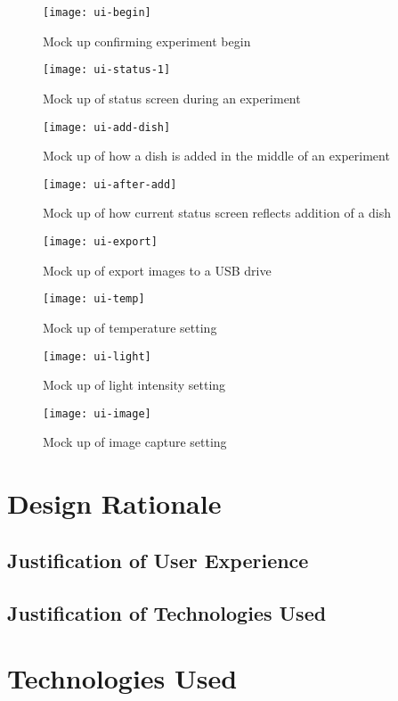\begin{figure}[H]
\texttt{[image: ui-begin]}
\caption{\label{figure:ui-begin} Mock up confirming experiment begin }
\end{figure}

\begin{figure}[H]
\texttt{[image: ui-status-1]}
\caption{\label{figure:ui-status} Mock up of status screen during an experiment}
\end{figure}

\begin{figure}[H]
\texttt{[image: ui-add-dish]}
\caption{\label{figure:ui-add} Mock up of how a dish is added in the middle of an experiment}
\end{figure}

\begin{figure}[H]
\texttt{[image: ui-after-add]}
\caption{\label{figure:ui-after-add} Mock up of how current status screen reflects addition of a dish}
\end{figure}

\begin{figure}[H]
\texttt{[image: ui-export]}
\caption{\label{figure:ui-export} Mock up of export images to a USB drive}
\end{figure}

\begin{figure}[H]
\texttt{[image: ui-temp]}
\caption{\label{figure:ui-temp} Mock up of temperature setting}

\end{figure}

\begin{figure}[H]
\texttt{[image: ui-light]}
\caption{\label{figure:ui-light} Mock up of light intensity setting}
\end{figure}

\begin{figure}[H]
\texttt{[image: ui-image]}
\caption{\label{figure:ui-image} Mock up of image capture setting}
\end{figure}

\section{Design Rationale}
\subsection{Justification of User Experience}
\subsection{Justification of Technologies Used}
\section{Technologies Used}